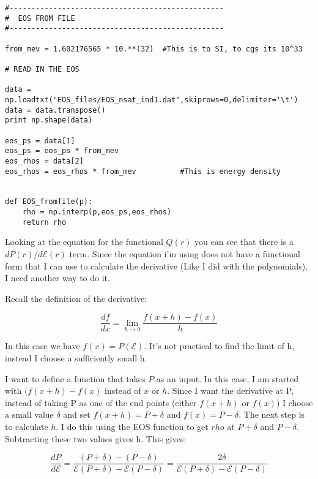 \documentclass[11pt]{article}
\numberwithin{equation}{section}
\begin{document}
\begin{lstlisting}
#-------------------------------------------------
#  EOS FROM FILE
#-------------------------------------------------

from_mev = 1.602176565 * 10.**(32)  #This is to SI, to cgs its 10^33 

# READ IN THE EOS 

data = np.loadtxt("EOS_files/EOS_nsat_ind1.dat",skiprows=0,delimiter='\t')
data = data.transpose()
print np.shape(data)

eos_ps = data[1]      
eos_ps = eos_ps * from_mev      
eos_rhos = data[2]    
eos_rhos = eos_rhos * from_mev          #This is energy density


def EOS_fromfile(p):
    rho = np.interp(p,eos_ps,eos_rhos)
    return rho
\end{lstlisting}


Looking at the equation for the functional $Q(r)$ you can see that there is a $dP(r)/d\mathcal{E}(r)$ term.  Since the equation i'm using does not have a functional form that I can use to calculate the derivative (Like I did with the polynomials), I need another way to do it.  

Recall the definition of the derivative:

\begin{equation}
\frac{df}{dx} = \lim_{h \to 0} \frac{f(x+h)-f(x)}{h}
\end{equation}

In this case we have $f(x) = P(\mathcal{E})$.  It's not practical to find the limit of h, instead I choose a sufficiently small h.

I want to define a function that takes $P$ as an input.  In this case, I am started with $(f(x+h)-f(x)$ instead of $x$ or $h$. Since I want the derivative at P, instead of taking P as one of the end points (either $f(x+h)$ or $f(x)$) I choose a small value $\delta$ and set $f(x+h) = P + \delta$ and $f(x) = P - \delta$.  The next step is to calculate $h$.  I do this using the EOS function to get $rho$ at $P+\delta$ and $P-\delta$.  Subtracting these two values gives h.  This gives:

\begin{equation}
\frac{dP}{d\mathcal{E}} = \frac{(P+\delta) - (P- \delta)}{\mathcal{E}(P+\delta)-\mathcal{E}(P-\delta)}  = \frac{2 \delta}{\mathcal{E}(P+\delta)-\mathcal{E}(P-\delta)}
\end{equation}
\end{document}

